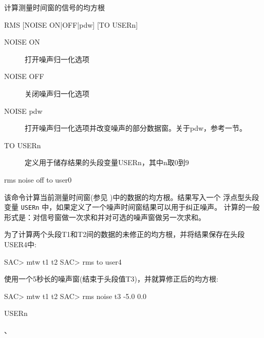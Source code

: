 \label{cmd:rms}

计算测量时间窗的信号的均方根

\begin{SACSTX}
RMS [NOISE ON|OFF|pdw] [TO USERn]
\end{SACSTX}

\begin{description}
\item [NOISE ON] 打开噪声归一化选项
\item [NOISE OFF] 关闭噪声归一化选项
\item [NOISE pdw] 打开噪声归一化选项并改变噪声的部分数据窗。关于pdw，参考一节。
\item [TO USERn] 定义用于储存结果的头段变量USERn，其中n取0到9
\end{description}

\begin{SACDFT}
rms noise off to user0
\end{SACDFT}

该命令计算当前测量时间窗(参见 )中的数据的均方根。结果写入一个
浮点型头段变量 \texttt{USERn} 中，如果定义了一个噪声时间窗结果可以用于纠正噪声。
计算的一般形式是：对信号窗做一次求和并对可选的噪声窗做另一次求和。

为了计算两个头段T1和T2间的数据的未修正的均方根，并将结果保存在头段USER4中:
\begin{SACCode}
SAC> mtw t1 t2
SAC> rms to user4
\end{SACCode}

使用一个5秒长的噪声窗(结束于头段值T3)，并就算修正后的均方根:
\begin{SACCode}
SAC> mtw t1 t2
SAC> rms noise t3 -5.0 0.0
\end{SACCode}

USERn

、